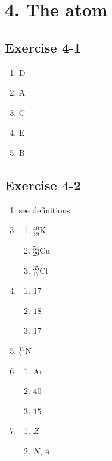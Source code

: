 
\section {4. The atom}
\subsection{Exercise 4-1} 
\begin{multicols}{5}
\begin{enumerate}[noitemsep, label=\textbf{\arabic*}. ] 
\item D
\item A
\item C
\item E
\item B
\end{enumerate}
\end{multicols}
\subsection{Exercise 4-2}
\begin{multicols}{5}
\begin{enumerate}[noitemsep, label=\textbf{\arabic*}. ]
 \item %
see definitions
\end{enumerate}
\begin{enumerate}[noitemsep, label=\textbf{\arabic*}. ]
\setcounter{enumi}{2}
 \item %
\begin{enumerate}[noitemsep, label=\textbf{\alph*}. ]
 \item $^{40}_{19}\text{K}$
\item $^{54}_{29}\text{Cu}$
\item $^{35}_{17}\text{Cl}$
\end{enumerate}
 \item %
\begin{enumerate}[noitemsep, label=\textbf{\alph*}. ]
 \item $17$
\item $18$
\item $17$
\end{enumerate}
 \item %
$^{15}_{7}\text{N}$
 \item %
\begin{enumerate}[noitemsep, label=\textbf{\alph*}. ]
 \item Ar
\item $40$
\item $15$
\end{enumerate}
 \item %
\begin{enumerate}[noitemsep, label=\textbf{\alph*}. ]
 \item $Z$
\item $N, A$
\end{enumerate}
\end{enumerate}
\end{multicols}
